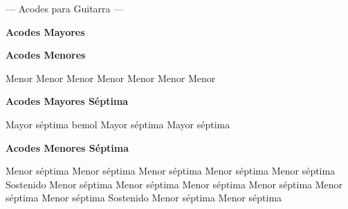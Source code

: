 %

\ifguitarra

\chead{\CHeadFont ({\rm\thepage})}
\rhead{\RHeadFont\RelDate}
{\parindent 8pt
        {\myTitleFont --- Acodes para Guitarra ---}}\par
\vskip 20pt
\textbf{Acodes Mayores}

\small
{}      

      
\normalsize

\vskip 20pt
\textbf{Acodes Menores}

\small
{} Menor  Menor  Menor  Menor  Menor  Menor  Menor

      
\normalsize

\vskip 20pt
\textbf{Acodes Mayores S\'eptima}

 Mayor s\'eptima
 bemol Mayor s\'eptima
 Mayor s\'eptima
\vskip 20pt
\vskip 20pt

\textbf{Acodes Menores S\'eptima}

\small
{} Menor s\'eptima
 Menor s\'eptima
 Menor s\'eptima
 Menor s\'eptima
 Menor s\'eptima
\vskip 20pt
 Sostenido Menor s\'eptima
 Menor s\'eptima
 Menor s\'eptima
 Menor s\'eptima
\vskip 20pt
 Menor s\'eptima
 Menor s\'eptima
 Sostenido Menor s\'eptima
 Menor s\'eptima
\normalsize

